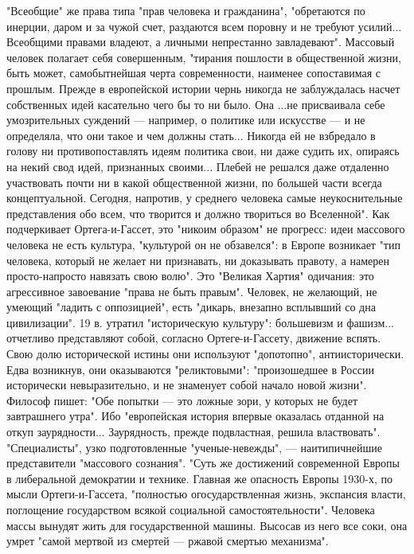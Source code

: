 \documentclass[12pt]{article}
\begin{document}
"Всеобщие" же права типа "прав человека и гражданина", "обретаются по инерции, даром и за чужой счет,
раздаются  всем  поровну  и  не  требуют  усилий...  Всеобщими  правами  владеют,  а  личными  непрестанно
завладевают". Массовый человек полагает себя совершенным, "тирания пошлости в общественной жизни, быть
может,  самобытнейшая  черта  современности,  наименее  сопоставимая  с  прошлым.  Прежде  в  европейской
истории чернь никогда не заблуждалась насчет собственных идей касательно чего бы то ни было. Она ...не
присваивала себе умозрительных суждений — например, о политике или искусстве — и не определяла, что они
такое и чем должны стать... Никогда ей не взбредало в голову ни противопоставлять идеям политика свои, ни
даже  судить  их,  опираясь  на  некий  свод  идей,  признанных  своими...  Плебей  не  решался  даже  отдаленно
участвовать  почти  ни  в  какой  общественной  жизни,  по  большей  части  всегда  концептуальной.  Сегодня,
напротив,  у  среднего  человека  самые  неукоснительные  представления  обо  всем,  что  творится  и  должно
твориться во Вселенной". Как подчеркивает Ортега-и-Гассет, это "никоим образом" не прогресс: идеи массового
человека не есть культура, "культурой он не обзавелся": в Европе возникает "тип человека, который не желает
ни признавать, ни доказывать правоту, а намерен просто-напросто навязать свою волю". Это "Великая Хартия"
одичания: это агрессивное завоевание "права не быть правым". Человек, не желающий, не умеющий "ладить с
оппозицией", есть "дикарь, внезапно всплывший со дна цивилизации". 19 в. утратил "историческую культуру":
большевизм и фашизм... отчетливо представляют собой, согласно Ортеге-и-Гассету, движение вспять. Свою
долю исторической истины они используют "допотопно", антиисторически. Едва возникнув, они оказываются
"реликтовыми": "произошедшее в России исторически невыразительно, и не знаменует собой начало новой
жизни". Философ пишет: "Обе попытки — это ложные зори, у которых не будет завтрашнего утра". Ибо
"европейская история впервые оказалась отданной на откуп заурядности... Заурядность, прежде подвластная,
решила  властвовать".  "Специалисты",  узко  подготовленные  "ученые-невежды",  —  наитипичнейшие
представители "массового сознания". "Суть же достижений современной Европы в либеральной демократии и
технике. Главная же опасность Европы 1930-х, по мысли Ортеги-и-Гассета, "полностью огосударствленная
жизнь, экспансия власти, поглощение государством всякой социальной самостоятельности". Человека массы
вынудят жить для государственной машины. Высосав из него все соки, она умрет "самой мертвой из смертей —
ржавой смертью механизма".
\end{document}
